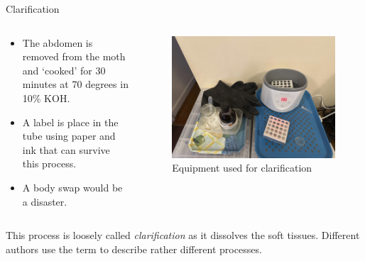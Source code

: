 \documentclass[
  ignorenonframetext,
]{beamer}
\providecommand{\tightlist}{%
  \setlength{\itemsep}{0pt}\setlength{\parskip}{0pt}}
\begin{document}
\begin{frame}{Clarification}
\protect\hypertarget{clarification}{}
\begin{columns}[T]
\begin{column}{0.5\textwidth}
\begin{itemize}
\tightlist
\item
  The abdomen is removed from the moth and `cooked' for 30 minutes at 70
  degrees in 10\% KOH.
\item
  A label is place in the tube using paper and ink that can survive this
  process.
\item
  A body swap would be a disaster.
\end{itemize}
\end{column}

\begin{column}{0.5\textwidth}
\begin{figure}
\centering
\includegraphics{./images/clarification.jpg}
\caption{Equipment used for clarification}
\end{figure}
\end{column}
\end{columns}

This process is loosely called \emph{clarification} as it dissolves the
soft tissues. Different authors use the term to describe rather
different processes.
\end{frame}
\end{document}
